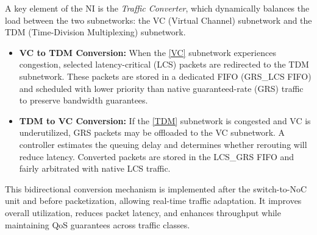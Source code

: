 A key element of the NI is the \textit{Traffic Converter}, which dynamically balances the load between the two subnetworks: the VC (Virtual Channel) subnetwork and the TDM (Time-Division Multiplexing) subnetwork.
\begin{itemize}
    \item \textbf{VC to TDM Conversion:} When the \ref{VC} subnetwork experiences congestion, selected latency-critical (LCS) packets are redirected to the TDM subnetwork. These packets are stored in a dedicated FIFO (GRS\_LCS FIFO) and scheduled with lower priority than native guaranteed-rate (GRS) traffic to preserve bandwidth guarantees.
    \item \textbf{TDM to VC Conversion:} If the \ref{TDM} subnetwork is congested and VC is underutilized, GRS packets may be offloaded to the VC subnetwork. A controller estimates the queuing delay and determines whether rerouting will reduce latency. Converted packets are stored in the LCS\_GRS FIFO and fairly arbitrated with native LCS traffic.
\end{itemize}
This bidirectional conversion mechanism is implemented after the switch-to-NoC unit and before packetization, allowing real-time traffic adaptation. It improves overall utilization, reduces packet latency, and enhances throughput while maintaining QoS guarantees across traffic classes.

